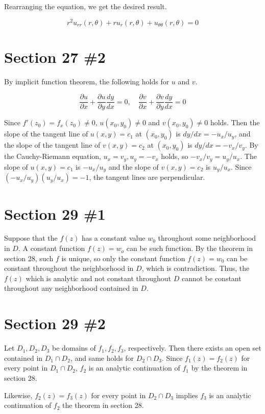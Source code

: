 \documentclass{scrartcl}
\begin{document}
Rearranging the equation, we get the desired result.

\[
  r^2 u_{rr}(r, \theta) + ru_r(r, \theta) + u_{\theta\theta}(r, \theta) = 0
\]

\section{Section 27 \#2}
By implicit function theorem, the following holds for \(u\) and \(v\).

\[
  \frac{\partial u}{\partial x} + \frac{\partial u}{\partial y} \frac{dy}{dx} = 0, \quad \frac{\partial v}{\partial x} + \frac{\partial v}{\partial y} \frac{dy}{dx} = 0
\]

Since \(f'(z_0) = f_x(z_0) \not = 0\), \(u(x_0, y_0) \not = 0\) and \(v(x_0, y_0) \not = 0\) holds.
Then the slope of the tangent line of \(u(x, y) = c_1\) at \((x_0, y_0)\) is \(dy/dx = -u_x / u_y\), and the slope of the tangent line of \(v(x, y) = c_2\) at \((x_0, y_0)\) is \(dy/dx = -v_x / v_y\).
By the Cauchy-Riemann equation, \(u_x = v_y, u_y = -v_x\) holds, so \(-v_x / v_y = u_y / u_x\).
The slope of \(u(x, y) = c_1\) is \(-u_x / u_y\) and the slope of \(v(x, y) = c_2\) is \(u_y / u_x\).
Since \((-u_x / u_y)(u_y / u_x) = -1\), the tangent lines are perpendicular.

\section{Section 29 \#1}
Suppose that the \(f(z)\) has a constant value \(w_0\) throughout some neighborhood in \(D\).
A constant function \(f(z) = w_o\) can be such function.
By the theorem in section 28, such \(f\) is unique, so only the constant function \(f(z) = w_0\) can be constant throughout the neighborhood in \(D\), which is contradiction.
Thus, the \(f(z)\) which is analytic and not constant throughout \(D\) cannot be constant throughout any neighborhood contained in \(D\).

\section{Section 29 \#2}
Let \(D_1, D_2, D_3\) be domains of \(f_1, f_2, f_3\), respectively.
Then there exists an open set contained in \(D_1 \cap D_2\), and same holds for \(D_2 \cap D_3\).
Since \(f_1(z) = f_2(z)\) for every point in \(D_1 \cap D_2\), \(f_2\) is an analytic continuation of \(f_1\) by the theorem in section 28.

Likewise, \(f_2(z) = f_3(z)\) for every point in \(D_2 \cap D_3\) implies \(f_3\) is an analytic continuation of \(f_2\) the theorem in section 28.
\end{document}
